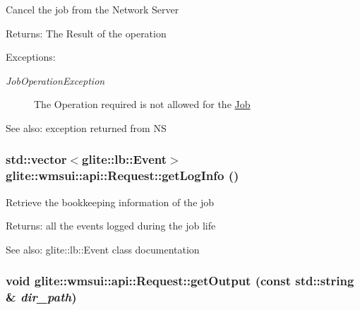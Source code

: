 Cancel the job from the Network Server \begin{Desc}
\item[Returns:]The Result of the operation \end{Desc}
\begin{Desc}
\item[Exceptions:]
\begin{description}
\item[{\em Job\-Operation\-Exception}]The Operation required is not allowed for the \hyperlink{classglite_1_1wmsui_1_1api_1_1Job}{Job} \end{description}
\end{Desc}
\begin{Desc}
\item[See also:]exception returned from NS \end{Desc}
\hypertarget{classglite_1_1wmsui_1_1api_1_1Request_z13_1}{
\subsubsection[getLogInfo]{\setlength{\rightskip}{0pt plus 5cm}std::vector$<$glite::lb::Event$>$ glite::wmsui::api::Request::get\-Log\-Info ()}}
\label{classglite_1_1wmsui_1_1api_1_1Request_z13_1}


Retrieve the bookkeeping information of the job \begin{Desc}
\item[Returns:]all the events logged during the job life \end{Desc}
\begin{Desc}
\item[See also:]glite::lb::Event class documentation \end{Desc}
\hypertarget{classglite_1_1wmsui_1_1api_1_1Request_z13_5}{
\subsubsection[getOutput]{\setlength{\rightskip}{0pt plus 5cm}void glite::wmsui::api::Request::get\-Output (const std::string \& {\em dir\_\-path})}}
\label{classglite_1_1wmsui_1_1api_1_1Request_z13_5}


